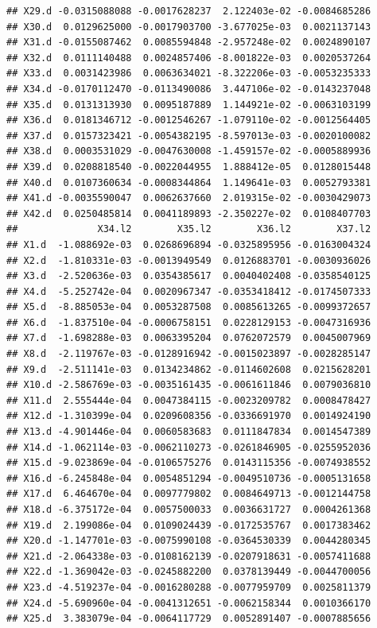 \documentclass[]{article}
\begin{document}
\begin{verbatim}
## X29.d -0.0315088088 -0.0017628237  2.122403e-02 -0.0084685286
## X30.d  0.0129625000 -0.0017903700 -3.677025e-03  0.0021137143
## X31.d -0.0155087462  0.0085594848 -2.957248e-02  0.0024890107
## X32.d  0.0111140488  0.0024857406 -8.001822e-03  0.0020537264
## X33.d  0.0031423986  0.0063634021 -8.322206e-03 -0.0053235333
## X34.d -0.0170112470 -0.0113490086  3.447106e-02 -0.0143237048
## X35.d  0.0131313930  0.0095187889  1.144921e-02 -0.0063103199
## X36.d  0.0181346712 -0.0012546267 -1.079110e-02 -0.0012564405
## X37.d  0.0157323421 -0.0054382195 -8.597013e-03 -0.0020100082
## X38.d  0.0003531029 -0.0047630008 -1.459157e-02 -0.0005889936
## X39.d  0.0208818540 -0.0022044955  1.888412e-05  0.0128015448
## X40.d  0.0107360634 -0.0008344864  1.149641e-03  0.0052793381
## X41.d -0.0035590047  0.0062637660  2.019315e-02 -0.0030429073
## X42.d  0.0250485814  0.0041189893 -2.350227e-02  0.0108407703
##              X34.l2        X35.l2        X36.l2        X37.l2
## X1.d  -1.088692e-03  0.0268696894 -0.0325895956 -0.0163004324
## X2.d  -1.810331e-03 -0.0013949549  0.0126883701 -0.0030936026
## X3.d  -2.520636e-03  0.0354385617  0.0040402408 -0.0358540125
## X4.d  -5.252742e-04  0.0020967347 -0.0353418412 -0.0174507333
## X5.d  -8.885053e-04  0.0053287508  0.0085613265 -0.0099372657
## X6.d  -1.837510e-04 -0.0006758151  0.0228129153 -0.0047316936
## X7.d  -1.698288e-03  0.0063395204  0.0762072579  0.0045007969
## X8.d  -2.119767e-03 -0.0128916942 -0.0015023897 -0.0028285147
## X9.d  -2.511141e-03  0.0134234862 -0.0114602608  0.0215628201
## X10.d -2.586769e-03 -0.0035161435 -0.0061611846  0.0079036810
## X11.d  2.555444e-04  0.0047384115 -0.0023209782  0.0008478427
## X12.d -1.310399e-04  0.0209608356 -0.0336691970  0.0014924190
## X13.d -4.901446e-04  0.0060583683  0.0111847834  0.0014547389
## X14.d -1.062114e-03 -0.0062110273 -0.0261846905 -0.0255952036
## X15.d -9.023869e-04 -0.0106575276  0.0143115356 -0.0074938552
## X16.d -6.245848e-04  0.0054851294 -0.0049510736 -0.0005131658
## X17.d  6.464670e-04  0.0097779802  0.0084649713 -0.0012144758
## X18.d -6.375172e-04  0.0057500033  0.0036631727  0.0004261368
## X19.d  2.199086e-04  0.0109024439 -0.0172535767  0.0017383462
## X20.d -1.147701e-03 -0.0075990108 -0.0364530339  0.0044280345
## X21.d -2.064338e-03 -0.0108162139 -0.0207918631 -0.0057411688
## X22.d -1.369042e-03 -0.0245882200  0.0378139449 -0.0044700056
## X23.d -4.519237e-04 -0.0016280288 -0.0077959709  0.0025811379
## X24.d -5.690960e-04 -0.0041312651 -0.0062158344  0.0010366170
## X25.d  3.383079e-04 -0.0064117729  0.0052891407 -0.0007885656

\end{verbatim}
\end{document}
